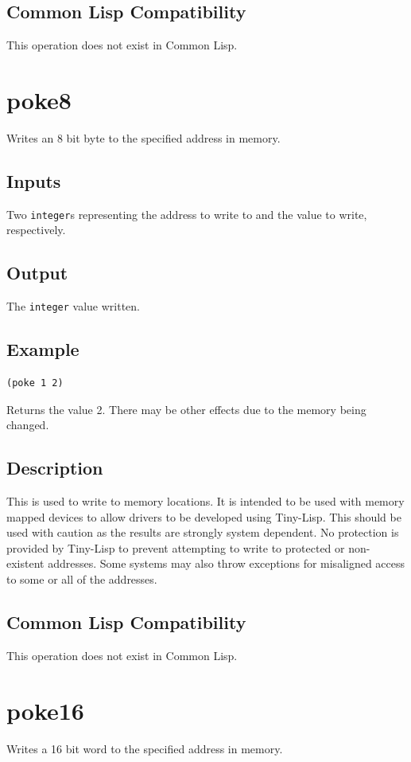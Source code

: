 \documentclass[10pt, openany]{book}
\newcommand{\datatype}[1]{\texttt{#1}}
\newcommand{\tl}{Tiny-Lisp}
\newcommand{\cl}{Common Lisp}
\begin{document}
\subsection{Common Lisp Compatibility}
This operation does not exist in \cl.

\section{poke8}
Writes an 8 bit byte to the specified address in memory.
\subsection{Inputs}
Two \datatype{integer}s representing the address to write to and the value to write, respectively.
\subsection{Output}
The \datatype{integer} value written.
\subsection{Example}
\begin{lstlisting}
(poke 1 2)
\end{lstlisting}
Returns the value 2.  There may be other effects due to the memory being changed.
\subsection{Description}
This is used to write to memory locations.  It is intended to be used with memory mapped devices to allow drivers to be developed using \tl{}.  This should be used with caution as the results are strongly system dependent.  No protection is provided by \tl{} to prevent attempting to write to protected or non-existent addresses.  Some systems may also throw exceptions for misaligned access to some or all of the addresses.
\subsection{Common Lisp Compatibility}
This operation does not exist in \cl.

\section{poke16}
Writes a 16 bit word to the specified address in memory.
\end{document}
